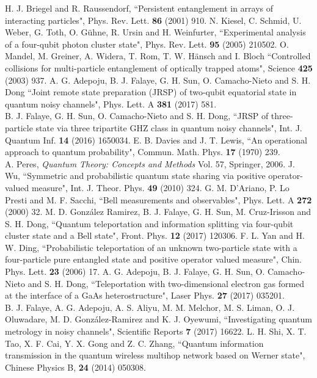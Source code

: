 \documentclass[aps,pra,twocolumn,showpacs,superscriptaddress,groupedaddress]{revtex4}
\begin{document}
\begin{thebibliography}{99}
 H. J. Briegel and R. Raussendorf, ``Persistent entanglement in arrays of interacting particles", Phys. Rev. Lett. {\bf86} (2001) 910. 
 N. Kiesel, C. Schmid, U. Weber, G. Toth, O. G\"uhne, R. Ursin and H. Weinfurter, ``Experimental analysis of a four-qubit photon cluster state", Phys. Rev. Lett. {\bf95} (2005) 210502.
 O. Mandel, M. Greiner, A. Widera, T. Rom, T. W. H\"ansch and I. Bloch ``Controlled collisions for multi-particle entanglement of optically trapped atoms", Science {\bf425} (2003) 937.
 A. G. Adepoju, B. J. Falaye, G. H. Sun, O. Camacho-Nieto and S. H. Dong ``Joint remote state preparation (JRSP) of two-qubit equatorial state in quantum noisy channels", Phys. Lett. A {\bf381} (2017) 581.\\
B. J. Falaye, G. H. Sun, O. Camacho-Nieto and S. H. Dong, ``JRSP of three-particle state via three tripartite GHZ class in quantum noisy channels", Int. J. Quantum Inf. {\bf14} (2016) 1650034.
 E. B. Davies and J. T. Lewis, ``An operational approach to quantum probability", Commun. Math. Phys. {\bf17} (1970) 239.\\
A. Peres, {\it Quantum Theory: Concepts and Methods} Vol. 57, Springer, 2006.
 J. Wu, ``Symmetric and probabilistic quantum state sharing via positive operator-valued measure", Int. J. Theor. Phys. {\bf49} (2010) 324.
 G. M. D'Ariano, P. Lo Presti and M. F. Sacchi, ``Bell measurements and observables", Phys. Lett. A {\bf272} (2000) 32. 
 M. D. Gonz\'alez Ramirez, B. J. Falaye, G. H. Sun, M. Cruz-Irisson and S. H. Dong, ``Quantum teleportation and information splitting via four-qubit cluster state and a Bell state", Front. Phys. {\bf12} (2017) 120306.
 F. L. Yan and H. W. Ding, ``Probabilistic teleportation of an unknown two-particle state with a four-particle pure entangled state and positive operator valued measure", Chin. Phys. Lett. {\bf23} (2006) 17.
 A. G. Adepoju, B. J. Falaye, G. H. Sun, O. Camacho-Nieto and S. H. Dong, ``Teleportation with two-dimensional electron gas formed at the interface of a GaAs heterostructure", Laser Phys. {\bf27} (2017) 035201.\\
B. J. Falaye, A. G. Adepoju, A. S. Aliyu, M. M. Melchor, M. S. Liman, O. J. Oluwadare, M. D. Gonz\'alez-Ramirez and K. J. Oyewumi, ``Investigating quantum metrology in noisy channels", Scientific Reports {\bf7} (2017) 16622.
 L. H. Shi, X. T. Tao, X. F. Cai, Y. X. Gong and Z. C. Zhang, ``Quantum information transmission in the quantum wireless multihop network based on Werner state", Chinese Physics B, {\bf24} (2014) 050308.
\end{thebibliography}
\end{document}
